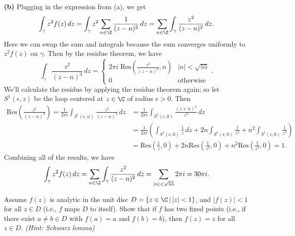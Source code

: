 \documentclass[11pt,letterpaper]{article}
\begin{document}
\begin{solution}
    \textbf{(b)} Plugging in the expression from (a), we get
    \[
        \int_{\gamma} z^2 f(z)\,dz = \int_{\gamma} z^2\sum_{n\in \Z}\frac{1}{(z-n)^2}\,dz = \sum_{n\in \Z}\int_\gamma \frac{z^2}{(z-n)^2}\,dz.
    \] 
    Here we can swap the sum and integrals because the sum converges uniformly to $z^2f(z)$ on $\gamma$. Then by the residue theorem, we have
    \[
        \int_\gamma \frac{z^2}{(z-n)^3}\,dz =\begin{cases}
            2\pi i\; \textrm{Res}\left(\frac{z^2}{(z-n)^3}, n\right) & |n| < \sqrt{55}\\
            0 &\textrm{otherwise}
        \end{cases}.
    \] 
    We'll calculate the residue by applying the residue theorem again; so let $S^1(\epsilon, z)$ be the loop centered at $z\in \C$ of radius $\epsilon>0$. Then
    \[\begin{aligned}
        \textrm{Res}\left(\frac{z^2}{(z-n)^3}\right) =\frac{1}{2\pi i}\int_{S^1(\epsilon, n)} \frac{z^2}{(z-n)^3}\,dz&=\frac{1}{2\pi i}\int_{S^1(\epsilon, 0)}\frac{(z+n)^2}{z^3}\,dz\\
        &=\frac{1}{2\pi i}\left(\int_{S^1(\epsilon, 0)}\frac{1}{z}\,dz + 2n\int_{S^1(\epsilon,0)} \frac{1}{z^2}+n^2\int_{S^1(\epsilon, 0)}\frac{1}{z^3}\right)\\
        &=\textrm{Res}\left(\frac{1}{z}, 0\right)+2n\textrm{Res}\left(\frac{1}{z^2}, 0\right)+n^2\textrm{Res}\left(\frac{1}{z^3}, 0\right) = 1.
    \end{aligned}\]
    Combining all of the results, we have
    \[
        \int_\gamma z^2f(z)\, dz = \sum_{n\in \Z}\int_\gamma \frac{z^2}{(z-n)^2}\,dz = \sum_{|n|<\sqrt{55}} 2\pi i = 30\pi i.
    \] 
    
\end{solution}

\begin{problem}
    Assume $f(z)$ is analytic in the unit disc $D=\{z\in\C\,|\,|z|<1\}$, and $|f(z)|<1$ for all $z\in D$ (i.e., $f$ maps $D$ to itself). Show that if $f$ has two fixed points (i.e., if there exist $a\neq b\in D$ with $f(a)=a$ and $f(b)=b$), then $f(z)=z$ for all $z\in D$. \textit{(Hint: Schwarz lemma)}
\end{problem}
\end{document}
